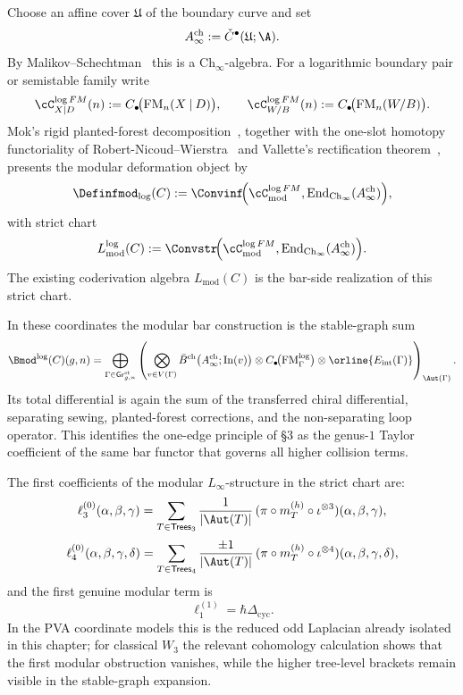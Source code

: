 \begin{construction}
\label{const:vol2-three-preprints-chain-level}
Choose an affine cover $\mathfrak U$ of the boundary curve and set
\[
A^{\mathrm{ch}}_\infty := \check C^\bullet(\mathfrak U;\A).
\]
By Malikov--Schechtman~\cite{MS24} this is a $\mathrm{Ch}_\infty$-algebra.
For a logarithmic boundary pair or semistable family write
\[
\cC^{\log FM}_{X\mathbin{|}D}(n):=C_\bullet\!\bigl(\operatorname{FM}_n(X\mathbin{|}D)\bigr),
\qquad
\cC^{\log FM}_{W/B}(n):=C_\bullet\!\bigl(\operatorname{FM}_n(W/B)\bigr).
\]
Mok's rigid planted-forest decomposition~\cite{Mok25}, together with the
one-slot homotopy functoriality of Robert-Nicoud--Wierstra~\cite{RNW19} and
Vallette's rectification theorem~\cite{Val16}, presents the modular
deformation object by
\[
\Definfmod_{\log}(C)
:=
\Convinf\!\Bigl(
\cC^{\log FM}_{\mathrm{mod}},
\operatorname{End}_{\mathrm{Ch}_\infty}(A^{\mathrm{ch}}_\infty)
\Bigr),
\]
with strict chart
\[
L^{\log}_{\mathrm{mod}}(C)
:=
\Convstr\!\Bigl(
\cC^{\log FM}_{\mathrm{mod}},
\operatorname{End}_{\mathrm{Ch}_\infty}(A^{\mathrm{ch}}_\infty)
\Bigr).
\]
The existing coderivation algebra $L_{\mathrm{mod}}(C)$ is the bar-side
realization of this strict chart.
\end{construction}

\begin{remark}
\label{rem:vol2-log-modular-bar-functor}
In these coordinates the modular bar construction is the stable-graph sum
\[
\Bmod^{\log}(C)(g,n)
=
\bigoplus_{\Gamma\in \mathsf{Gr}^{\mathrm{st}}_{g,n}}
\left(
\bigotimes_{v\in V(\Gamma)} \bar B^{\mathrm{ch}}\bigl(A^{\mathrm{ch}}_\infty;\mathrm{In}(v)\bigr)
\otimes
C_\bullet\!\bigl(\operatorname{FM}^{\log}_{\Gamma}\bigr)
\otimes
\orline{E_{\mathrm{int}}(\Gamma)}
\right)_{\Aut(\Gamma)}.
\]
Its total differential is again the sum of the transferred chiral
differential, separating sewing, planted-forest corrections, and the
non-separating loop operator.  This identifies the one-edge principle of
\S3 as the genus-$1$ Taylor coefficient of the same bar functor that
governs all higher collision terms.
\end{remark}

\begin{computation}
\label{comp:vol2-low-genus-control}
The first coefficients of the modular $L_\infty$-structure in the strict chart
are:
\[
\ell_3^{(0)}(\alpha,\beta,\gamma)
=
\sum_{T\in\mathsf{Trees}_3}
\frac{1}{|\Aut(T)|}\,
(\pi\circ m_T^{(h)}\circ\iota^{\otimes 3})(\alpha,\beta,\gamma),
\]
\[
\ell_4^{(0)}(\alpha,\beta,\gamma,\delta)
=
\sum_{T\in\mathsf{Trees}_4}
\frac{\pm1}{|\Aut(T)|}\,
(\pi\circ m_T^{(h)}\circ\iota^{\otimes 4})(\alpha,\beta,\gamma,\delta),
\]
and the first genuine modular term is
\[
\ell_1^{(1)} = \hbar\Delta_{\mathrm{cyc}}.
\]
In the PVA coordinate models this is the reduced odd Laplacian already
isolated in this chapter; for classical $W_3$ the relevant cohomology
calculation shows that the first modular obstruction vanishes, while the
higher tree-level brackets remain visible in the stable-graph expansion.
\end{computation}

